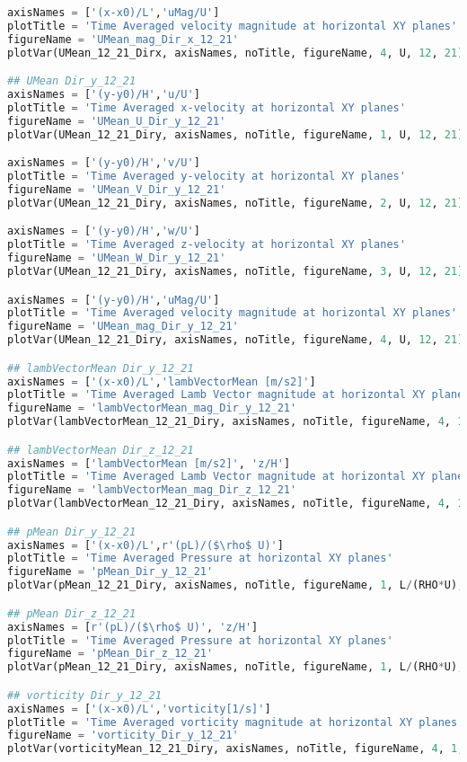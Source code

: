 \begin{lstlisting}[language=python]
axisNames = ['(x-x0)/L','uMag/U']
plotTitle = 'Time Averaged velocity magnitude at horizontal XY planes'
figureName = 'UMean_mag_Dir_x_12_21'
plotVar(UMean_12_21_Dirx, axisNames, noTitle, figureName, 4, U, 12, 21)

## UMean Dir_y_12_21
axisNames = ['(y-y0)/H','u/U']
plotTitle = 'Time Averaged x-velocity at horizontal XY planes'
figureName = 'UMean_U_Dir_y_12_21'
plotVar(UMean_12_21_Diry, axisNames, noTitle, figureName, 1, U, 12, 21)

axisNames = ['(y-y0)/H','v/U']
plotTitle = 'Time Averaged y-velocity at horizontal XY planes'
figureName = 'UMean_V_Dir_y_12_21'
plotVar(UMean_12_21_Diry, axisNames, noTitle, figureName, 2, U, 12, 21)

axisNames = ['(y-y0)/H','w/U']
plotTitle = 'Time Averaged z-velocity at horizontal XY planes'
figureName = 'UMean_W_Dir_y_12_21'
plotVar(UMean_12_21_Diry, axisNames, noTitle, figureName, 3, U, 12, 21)

axisNames = ['(y-y0)/H','uMag/U']
plotTitle = 'Time Averaged velocity magnitude at horizontal XY planes'
figureName = 'UMean_mag_Dir_y_12_21'
plotVar(UMean_12_21_Diry, axisNames, noTitle, figureName, 4, U, 12, 21)

## lambVectorMean Dir_y_12_21
axisNames = ['(x-x0)/L','lambVectorMean [m/s2]']
plotTitle = 'Time Averaged Lamb Vector magnitude at horizontal XY planes'
figureName = 'lambVectorMean_mag_Dir_y_12_21'
plotVar(lambVectorMean_12_21_Diry, axisNames, noTitle, figureName, 4, 1, 12, 21)

## lambVectorMean Dir_z_12_21
axisNames = ['lambVectorMean [m/s2]', 'z/H']
plotTitle = 'Time Averaged Lamb Vector magnitude at horizontal XY planes'
figureName = 'lambVectorMean_mag_Dir_z_12_21'
plotVar(lambVectorMean_12_21_Diry, axisNames, noTitle, figureName, 4, 1, 12, 21)

## pMean Dir_y_12_21
axisNames = ['(x-x0)/L',r'(pL)/($\rho$ U)']
plotTitle = 'Time Averaged Pressure at horizontal XY planes'
figureName = 'pMean_Dir_y_12_21'
plotVar(pMean_12_21_Diry, axisNames, noTitle, figureName, 1, L/(RHO*U), 12, 21)

## pMean Dir_z_12_21
axisNames = [r'(pL)/($\rho$ U)', 'z/H']
plotTitle = 'Time Averaged Pressure at horizontal XY planes'
figureName = 'pMean_Dir_z_12_21'
plotVar(pMean_12_21_Diry, axisNames, noTitle, figureName, 1, L/(RHO*U), 12, 21)

## vorticity Dir_y_12_21
axisNames = ['(x-x0)/L','vorticity[1/s]']
plotTitle = 'Time Averaged vorticity magnitude at horizontal XY planes'
figureName = 'vorticity_Dir_y_12_21'
plotVar(vorticityMean_12_21_Diry, axisNames, noTitle, figureName, 4, 1, 12, 21)


\end{lstlisting}
